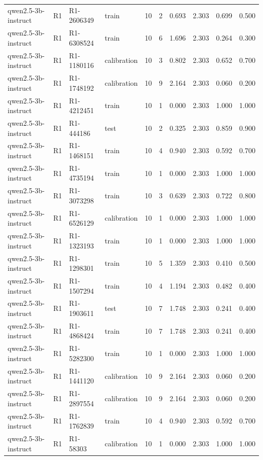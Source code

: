 \begin{table}
\begin{tabular}{llllrrrrrr}
qwen2.5-3b-instruct & R1 & R1-2606349 & train & 10 & 2 & 0.693 & 2.303 & 0.699 & 0.500 \\
qwen2.5-3b-instruct & R1 & R1-6308524 & train & 10 & 6 & 1.696 & 2.303 & 0.264 & 0.300 \\
qwen2.5-3b-instruct & R1 & R1-1180116 & calibration & 10 & 3 & 0.802 & 2.303 & 0.652 & 0.700 \\
qwen2.5-3b-instruct & R1 & R1-1748192 & calibration & 10 & 9 & 2.164 & 2.303 & 0.060 & 0.200 \\
qwen2.5-3b-instruct & R1 & R1-4212451 & train & 10 & 1 & 0.000 & 2.303 & 1.000 & 1.000 \\
qwen2.5-3b-instruct & R1 & R1-444186 & test & 10 & 2 & 0.325 & 2.303 & 0.859 & 0.900 \\
qwen2.5-3b-instruct & R1 & R1-1468151 & train & 10 & 4 & 0.940 & 2.303 & 0.592 & 0.700 \\
qwen2.5-3b-instruct & R1 & R1-4735194 & train & 10 & 1 & 0.000 & 2.303 & 1.000 & 1.000 \\
qwen2.5-3b-instruct & R1 & R1-3073298 & train & 10 & 3 & 0.639 & 2.303 & 0.722 & 0.800 \\
qwen2.5-3b-instruct & R1 & R1-6526129 & calibration & 10 & 1 & 0.000 & 2.303 & 1.000 & 1.000 \\
qwen2.5-3b-instruct & R1 & R1-1323193 & train & 10 & 1 & 0.000 & 2.303 & 1.000 & 1.000 \\
qwen2.5-3b-instruct & R1 & R1-1298301 & train & 10 & 5 & 1.359 & 2.303 & 0.410 & 0.500 \\
qwen2.5-3b-instruct & R1 & R1-1507294 & train & 10 & 4 & 1.194 & 2.303 & 0.482 & 0.400 \\
qwen2.5-3b-instruct & R1 & R1-1903611 & test & 10 & 7 & 1.748 & 2.303 & 0.241 & 0.400 \\
qwen2.5-3b-instruct & R1 & R1-4868424 & train & 10 & 7 & 1.748 & 2.303 & 0.241 & 0.400 \\
qwen2.5-3b-instruct & R1 & R1-5282300 & train & 10 & 1 & 0.000 & 2.303 & 1.000 & 1.000 \\
qwen2.5-3b-instruct & R1 & R1-1441120 & calibration & 10 & 9 & 2.164 & 2.303 & 0.060 & 0.200 \\
qwen2.5-3b-instruct & R1 & R1-2897554 & calibration & 10 & 9 & 2.164 & 2.303 & 0.060 & 0.200 \\
qwen2.5-3b-instruct & R1 & R1-1762839 & train & 10 & 4 & 0.940 & 2.303 & 0.592 & 0.700 \\
qwen2.5-3b-instruct & R1 & R1-58303 & calibration & 10 & 1 & 0.000 & 2.303 & 1.000 & 1.000 \\

\end{tabular}
\end{table}
